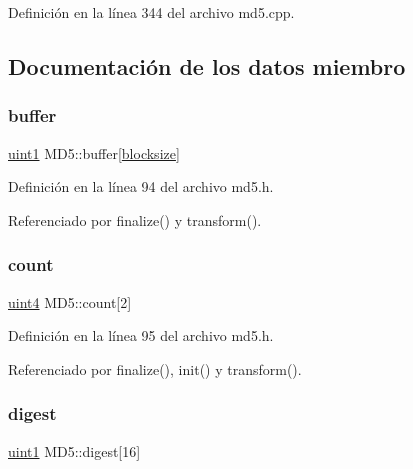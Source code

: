 Definición en la línea 344 del archivo md5.\+cpp.



\subsection{Documentación de los datos miembro}
\hypertarget{classMD5_a0df603b8332399d5c1daa08ab5a315ea}{}\label{classMD5_a0df603b8332399d5c1daa08ab5a315ea} 
\subsubsection{\texorpdfstring{buffer}{buffer}}
{\footnotesize\ttfamily \hyperlink{classMD5_a3b1c4901139aef256ee49c4ab14d09f9}{uint1} M\+D5\+::buffer\mbox{[}\hyperlink{classMD5_a227e6f16f2409956b516b453e6bc7429a1cc0a742ca803f75a021aef77b522963}{blocksize}\mbox{]}\hspace{0.3cm}{\ttfamily [private]}}



Definición en la línea 94 del archivo md5.\+h.



Referenciado por finalize() y transform().

\hypertarget{classMD5_a52a9ff26a3de9e831b17c1740aa5388a}{}\label{classMD5_a52a9ff26a3de9e831b17c1740aa5388a} 
\subsubsection{\texorpdfstring{count}{count}}
{\footnotesize\ttfamily \hyperlink{classMD5_a2e5b84a3d7db292f49873061214a0444}{uint4} M\+D5\+::count\mbox{[}2\mbox{]}\hspace{0.3cm}{\ttfamily [private]}}



Definición en la línea 95 del archivo md5.\+h.



Referenciado por finalize(), init() y transform().

\hypertarget{classMD5_a31058e1dca10bbf29818bb5177ff02ac}{}\label{classMD5_a31058e1dca10bbf29818bb5177ff02ac} 
\subsubsection{\texorpdfstring{digest}{digest}}
{\footnotesize\ttfamily \hyperlink{classMD5_a3b1c4901139aef256ee49c4ab14d09f9}{uint1} M\+D5\+::digest\mbox{[}16\mbox{]}\hspace{0.3cm}{\ttfamily [private]}}



